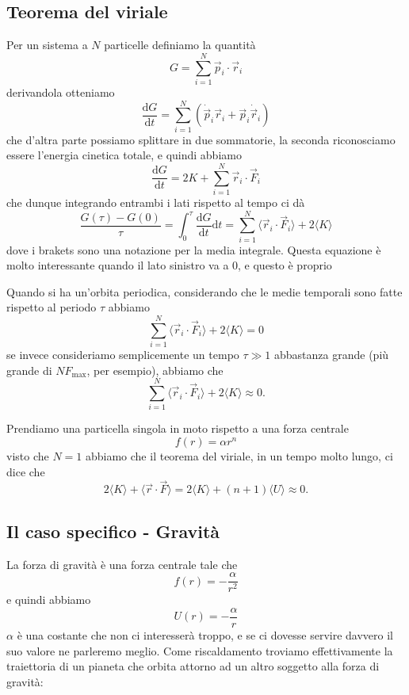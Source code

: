 \documentclass[11pt]{scrartcl}
\newcommand{\dif}{\text{d}}
\newcommand{\posit}{\vec{r}}
\begin{document}
	\subsection{Teorema del viriale}
	Per un sistema a $N$ particelle definiamo la quantità 
	$$G=\sum_{i=1}^{N}\vec{p}_i\cdot\posit_i$$
	derivandola otteniamo
	$$\frac{\dif G}{\dif t}=\sum_{i=1}^N \left(\dot{\vec{p}}_i\posit_i+\vec{p}_i\dot{\posit}_i\right)$$
	che d'altra parte possiamo splittare in due sommatorie, la seconda riconosciamo essere l'energia cinetica totale, e quindi abbiamo
	$$\frac{\dif G}{\dif t}=2K+\sum_{i=1}^{N}\posit_i\cdot \vec{F}_i$$
	che dunque integrando entrambi i lati rispetto al tempo ci dà
	$$\frac{G(\tau)-G(0)}{\tau}=\int_0^\tau \frac{\dif G}{\dif t}\dif t=\sum_{i=1}^{N}\langle \posit_i\cdot \vec{F}_i \rangle + 2 \langle K \rangle$$
	dove i brakets sono una notazione per la media integrale. Questa equazione è molto interessante quando il lato sinistro va a $0$, e questo è proprio
	\begin{theorem}
		Quando si ha un'orbita periodica, considerando che le medie temporali sono fatte rispetto al periodo $\tau$ abbiamo
		$$\sum_{i=1}^{N}\langle \posit_i\cdot \vec{F}_i \rangle + 2 \langle K \rangle=0$$
		se invece consideriamo semplicemente un tempo $\tau\gg 1 $ abbastanza grande (più grande di $NF_\text{max}$, per esempio), abbiamo che
		$$\sum_{i=1}^{N}\langle \posit_i\cdot \vec{F}_i \rangle + 2 \langle K \rangle\approx 0.$$
	\end{theorem}
	\begin{example}
		Prendiamo una particella singola in moto rispetto a una forza centrale
		$$f(r)=\alpha r^n$$
		visto che $N=1$ abbiamo che il teorema del viriale, in un tempo molto lungo, ci dice che
		$$2\langle K \rangle + \langle \posit \cdot \vec{F}\rangle=2\langle K \rangle +(n+1)\langle U \rangle\approx 0.$$
	\end{example}
	
	\subsection{Il caso specifico - Gravità}
	
	La forza di gravità è una forza centrale tale che
	$$f(r)=-\frac{\alpha}{r^2}$$
	e quindi abbiamo 
	$$U(r)=-\frac{\alpha}{r}$$
	$\alpha$ è una costante che non ci interesserà troppo, e se ci dovesse servire davvero il suo valore ne parleremo meglio. Come riscaldamento troviamo effettivamente la traiettoria di un pianeta che orbita attorno ad un altro soggetto alla forza di gravità: \\
\end{document}
